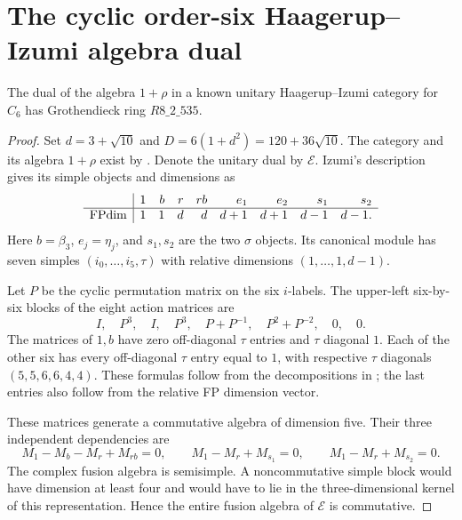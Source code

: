 \section{The cyclic order-six Haagerup--Izumi algebra dual}
\label{sec:hi6-dual}

\begin{proposition}\label{prop:r535-model}
The dual of the algebra $1+\rho$ in a known unitary Haagerup--Izumi
category for $C_6$ has Grothendieck ring $R8\_2\_535$.
\end{proposition}
\begin{proof}
Set $d=3+\sqrt{10}$ and $D=6(1+d^2)=120+36\sqrt{10}$.
The category and its algebra $1+\rho$ exist by
\cite[Example~4.5 and condition~(2.24)]{GICenters}. Denote the
unitary dual by $\mathcal E$. Izumi's description
\cite[Proposition~7.4 and Theorem~7.5]{Izumi3n} gives its simple
objects and dimensions as
\[
\begin{array}{c|rrrrrrrr}
&1&b&r&rb&e_1&e_2&s_1&s_2\\\hline
\operatorname{FPdim}&1&1&d&d&d+1&d+1&d-1&d-1.
\end{array}
\]
Here $b=\beta_3$, $e_j=\eta_j$, and $s_1,s_2$ are the two
$\sigma$ objects. Its canonical module has seven simples
$(i_0,\ldots,i_5,\tau)$ with relative dimensions
$(1,\ldots,1,d-1)$.

Let $P$ be the cyclic permutation matrix on the six $i$-labels.
The upper-left six-by-six blocks of the eight action matrices are
\[
I,\quad P^3,\quad I,\quad P^3,\quad
P+P^{-1},\quad P^2+P^{-2},\quad0,\quad0.
\]
The matrices of $1,b$ have zero off-diagonal $\tau$ entries and
$\tau$ diagonal $1$. Each of the other six has every off-diagonal
$\tau$ entry equal to $1$, with respective $\tau$ diagonals
$(5,5,6,6,4,4)$. These formulas follow from the decompositions in
\cite[Proposition~7.4]{Izumi3n}; the last entries also follow from
the relative FP dimension vector.

These matrices generate a commutative algebra of dimension five.
Their three independent dependencies are
\[
M_1-M_b-M_r+M_{rb}=0,\qquad
M_1-M_r+M_{s_1}=0,\qquad M_1-M_r+M_{s_2}=0.
\]
The complex fusion algebra is semisimple. A noncommutative simple
block would have dimension at least four and would have to lie in
the three-dimensional kernel of this representation. Hence the
entire fusion algebra of $\mathcal E$ is commutative.


\end{proof}
